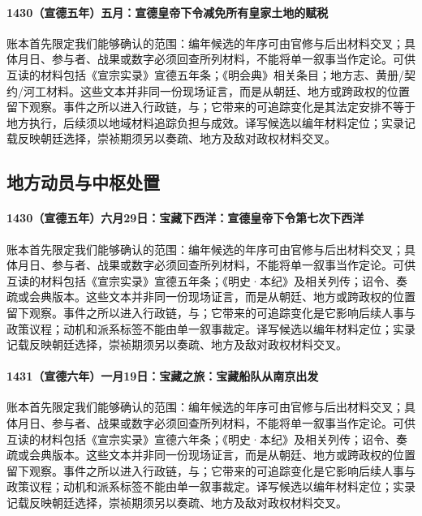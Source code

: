 \paragraph{1430（宣德五年）五月：宣德皇帝下令减免所有皇家土地的赋税} 账本首先限定我们能够确认的范围：编年候选的年序可由官修与后出材料交叉；具体月日、参与者、战果或数字必须回查所列材料，不能将单一叙事当作定论。可供互读的材料包括《宣宗实录》宣德五年条；《明会典》相关条目；地方志、黄册/契约/河工材料。这些文本并非同一份现场证言，而是从朝廷、地方或跨政权的位置留下观察。事件之所以进入行政链，与；它带来的可追踪变化是其法定安排不等于地方执行，后续须以地域材料追踪负担与成效。译写候选以编年材料定位；实录记载反映朝廷选择，崇祯期须另以奏疏、地方及敌对政权材料交叉。

\subsection{地方动员与中枢处置}

\paragraph{1430（宣德五年）六月29日：宝藏下西洋：宣德皇帝下令第七次下西洋} 账本首先限定我们能够确认的范围：编年候选的年序可由官修与后出材料交叉；具体月日、参与者、战果或数字必须回查所列材料，不能将单一叙事当作定论。可供互读的材料包括《宣宗实录》宣德五年条；《明史·本纪》及相关列传；诏令、奏疏或会典版本。这些文本并非同一份现场证言，而是从朝廷、地方或跨政权的位置留下观察。事件之所以进入行政链，与；它带来的可追踪变化是它影响后续人事与政策议程；动机和派系标签不能由单一叙事裁定。译写候选以编年材料定位；实录记载反映朝廷选择，崇祯期须另以奏疏、地方及敌对政权材料交叉。

\paragraph{1431（宣德六年）一月19日：宝藏之旅：宝藏船队从南京出发} 账本首先限定我们能够确认的范围：编年候选的年序可由官修与后出材料交叉；具体月日、参与者、战果或数字必须回查所列材料，不能将单一叙事当作定论。可供互读的材料包括《宣宗实录》宣德六年条；《明史·本纪》及相关列传；诏令、奏疏或会典版本。这些文本并非同一份现场证言，而是从朝廷、地方或跨政权的位置留下观察。事件之所以进入行政链，与；它带来的可追踪变化是它影响后续人事与政策议程；动机和派系标签不能由单一叙事裁定。译写候选以编年材料定位；实录记载反映朝廷选择，崇祯期须另以奏疏、地方及敌对政权材料交叉。

